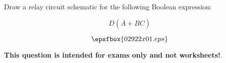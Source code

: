 

Draw a relay circuit schematic for the following Boolean expression:

$$D(\overline{A} + BC)$$







$$\epsfbox{02922x01.eps}$$







{\bf This question is intended for exams only and not worksheets!}.




